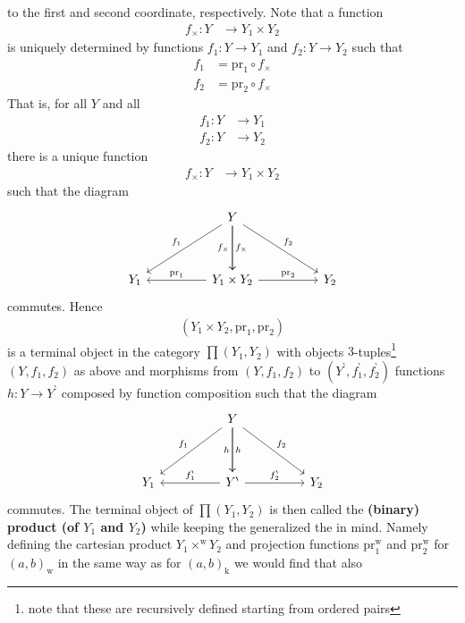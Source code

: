 to the first and second coordinate, respectively. Note that a function
\begin{align*}
  f_{\times}
  \colon
  Y
  &\rightarrow
  Y_{1}
  \times
  Y_{2}
\end{align*}
is uniquely determined by functions $f_{1} \colon Y \rightarrow Y_{1}$ and $f_{2} \colon Y \rightarrow Y_{2}$ such that
\begin{align*}
  f_{1}
  &=
  \mathrm{pr}_{1}
  \circ
  f_{\times}
  \\
  f_{2}
  &=
  \mathrm{pr}_{2}
  \circ
  f_{\times}
\end{align*}
That is, for all $Y$ and all
\begin{align*}
  f_{1}
  \colon
  Y
  &\rightarrow
  Y_{1}
  \\
  f_{2}
  \colon
  Y
  &\rightarrow
  Y_{2}
\end{align*}
there is a unique function
\begin{align*}
  f_{\times}
  \colon
  Y
  &\rightarrow
  Y_{1}
  \times
  Y_{2}
\end{align*}
such that the diagram
\[
\begin{tikzcd}[sep=huge]
  &
  Y
  \arrow{dr}{f_{2}}
  \arrow{d}{f_{\times}}
  \arrow[swap]{d}{f_{\times}}
  \arrow[swap]{dl}{f_{1}}
  &
  \\
  Y_{1}
  &
  Y_{1}
  \times
  Y_{2}
  \arrow{r}{\mathrm{pr}_{2}}
  \arrow[swap]{l}{\mathrm{pr}_{1}}
  &
  Y_{2}
\end{tikzcd}
\]
commutes. Hence
\begin{align*}
  \left(
    Y_{1}
    \times
    Y_{2},
    \mathrm{pr}_{1},
    \mathrm{pr}_{2}
  \right)
\end{align*}
is a terminal object in the category $\pmb{\prod}(Y_{1},Y_{2})$ with objects $3$-tuples\footnote{note that these are recursively defined starting from ordered pairs} $(Y,f_{1},f_{2})$ as above and morphisms from $(Y,f_{1},f_{2})$ to $(Y^{\backprime},f_{1}^{\backprime},f_{2}^{\backprime})$ functions $h \colon Y \rightarrow Y^{\backprime}$ composed by function composition such that the diagram
\[
\begin{tikzcd}[sep=huge]
  &
  Y
  \arrow{dr}{f_{2}}
  \arrow{d}{h}
  \arrow[swap]{d}{h}
  \arrow[swap]{dl}{f_{1}}
  &
  \\
  Y_{1}
  &
  Y^{\backprime}
  \arrow{r}{f_{2}^{\backprime}}
  \arrow[swap]{l}{f_{1}^{\backprime}}
  &
  Y_{2}
\end{tikzcd}
\]
commutes. The terminal object of $\pmb{\prod}(Y_{1},Y_{2})$ is then called the \textbf{(binary) product (of $Y_{1}$ and $Y_{2}$)} while keeping the generalized {\glqq}the{\grqq} in mind. Namely defining the cartesian product $Y_{1} \times^{\textrm{w}} Y_{2}$ and projection functions $\mathrm{pr}_{1}^{\textrm{w}}$ and $\mathrm{pr}_{2}^{\textrm{w}}$ for $(a,b)_{\textrm{w}}$ in the same way as for $(a,b)_{\textrm{k}}$ we would find that also 
